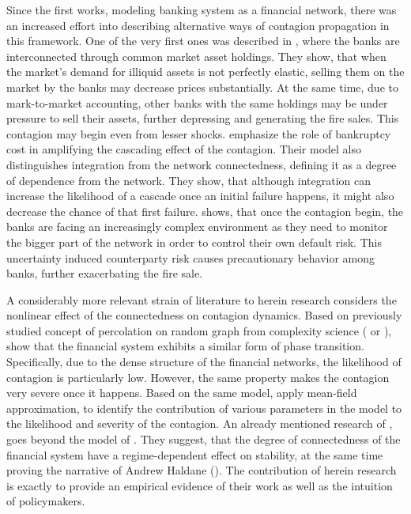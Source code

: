 \documentclass[12pt]{article}
\begin{document}
Since the first works, modeling banking system as a financial network, there was an increased effort into describing alternative ways of contagion propagation in this framework. One of the very first ones was described in \cite{cifuentes05}, where the banks are interconnected through common market asset holdings. They show, that when the market's demand for illiquid assets is not perfectly elastic, selling them on the market by the banks may decrease prices substantially. At the same time, due to mark-to-market accounting, other banks with the same holdings may be under pressure to sell their assets, further depressing and generating the fire sales. This contagion may begin even from lesser shocks. \citet{elliot14} emphasize the role of bankruptcy cost in amplifying the cascading effect of the contagion. Their model also distinguishes integration from the network connectedness, defining it as a degree of dependence from the network. They show, that although integration can increase the likelihood of a cascade once an initial failure happens, it might also decrease the chance of that first failure. \cite{caballero13} shows, that once the contagion begin, the banks are facing an increasingly complex environment as they need to monitor the bigger part of the network in order to control their own default risk. This uncertainty induced counterparty risk causes precautionary behavior among banks, further exacerbating the fire sale.

A considerably more relevant strain of literature to herein research considers the nonlinear effect of the connectedness on contagion dynamics. Based on previously studied concept of percolation on random graph from complexity science (\cite{callaway00} or \cite{newman001}), \cite{gai10} show that the financial system exhibits a similar form of phase transition. Specifically, due to the dense structure of the financial networks, the likelihood of contagion is particularly low. However, the same property makes the contagion very severe once it happens. Based on the same model, \cite{may10} apply mean-field approximation, to identify the contribution of various parameters in the model to the likelihood and severity of the contagion. An already mentioned research of \cite{acemoglu13}, goes beyond the model of \cite{gai10}. They suggest, that the degree of connectedness of the financial system have a regime-dependent effect on stability, at the same time proving the narrative of Andrew Haldane (\cite{haldane13}). The contribution of herein research is exactly to provide an empirical evidence of their work as well as the intuition of policymakers.  
\end{document}
